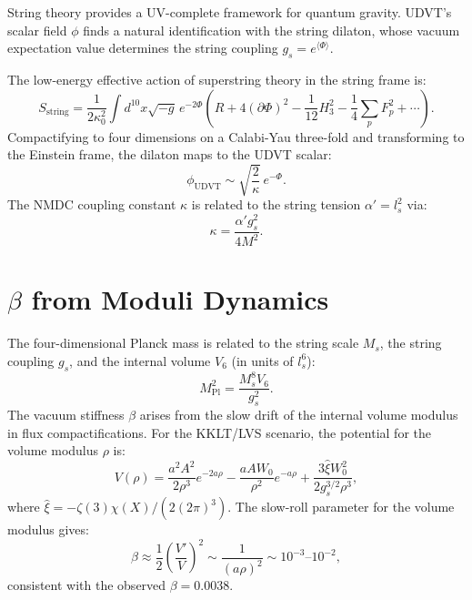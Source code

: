 \documentclass[12pt,a4paper]{book}
\theoremstyle{definition}
\theoremstyle{remark}
\begin{document}
String theory provides a UV-complete framework for quantum gravity. UDVT's scalar field $\phi$ finds a natural identification with the string dilaton, whose vacuum expectation value determines the string coupling $g_s = e^{\langle\Phi\rangle}$.

The low-energy effective action of superstring theory in the string frame is:
\begin{equation}
    S_{\mathrm{string}} = \frac{1}{2\kappa_0^2} \int d^{10}x \sqrt{-g} \, e^{-2\Phi} \left(R + 4(\partial\Phi)^2 - \frac{1}{12}H_3^2 - \frac{1}{4}\sum_p F_p^2 + \cdots\right).
\end{equation}
Compactifying to four dimensions on a Calabi-Yau three-fold and transforming to the Einstein frame, the dilaton maps to the UDVT scalar:
\begin{equation}
    \phi_{\mathrm{UDVT}} \sim \sqrt{\frac{2}{\kappa}} \, e^{-\Phi}.
\end{equation}
The NMDC coupling constant $\kappa$ is related to the string tension $\alpha' = l_s^2$ via:
\begin{equation}
    \kappa = \frac{\alpha' g_s^2}{4M^2}.
\end{equation}

\section{$\beta$ from Moduli Dynamics}

The four-dimensional Planck mass is related to the string scale $M_s$, the string coupling $g_s$, and the internal volume $V_6$ (in units of $l_s^6$):
\begin{equation}
    M_{\mathrm{Pl}}^2 = \frac{M_s^8 V_6}{g_s^2}.
\end{equation}
The vacuum stiffness $\beta$ arises from the slow drift of the internal volume modulus in flux compactifications. For the KKLT/LVS scenario, the potential for the volume modulus $\rho$ is:
\begin{equation}
    V(\rho) = \frac{a^2 A^2}{2\rho^3} e^{-2a\rho} - \frac{a A W_0}{\rho^2} e^{-a\rho} + \frac{3\hat{\xi} W_0^2}{2g_s^{3/2}\rho^3},
\end{equation}
where $\hat{\xi} = -\zeta(3)\chi(X)/(2(2\pi)^3)$. The slow-roll parameter for the volume modulus gives:
\begin{equation}
    \beta \approx \frac{1}{2}\left(\frac{V'}{V}\right)^2 \sim \frac{1}{(a\rho)^2} \sim 10^{-3} \text{--} 10^{-2},
\end{equation}
consistent with the observed $\beta = 0.0038$.
\end{document}
